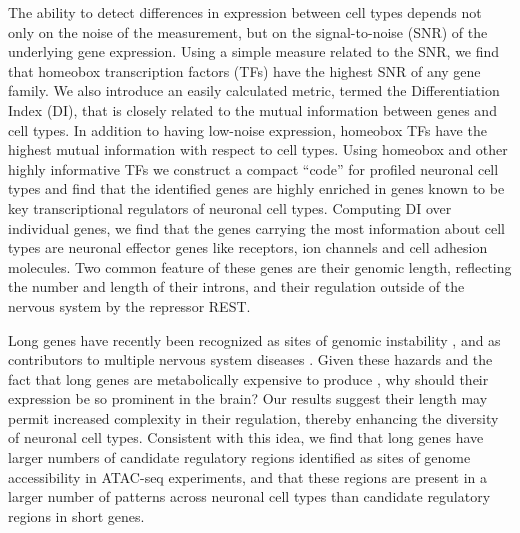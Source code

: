 The ability to detect differences in expression between cell types depends not only on the noise of the measurement, but on the signal-to-noise (SNR) of the underlying gene expression. Using a simple measure related to the SNR, we find that homeobox transcription factors (TFs) have the highest SNR of any gene family. We also introduce an easily calculated metric, termed the Differentiation Index (DI), that is closely related to the mutual information between genes and cell types. In addition to having low-noise expression, homeobox TFs have the highest mutual information with respect to cell types. Using homeobox and other highly informative TFs we construct a compact “code” for profiled neuronal cell types and find that the identified genes are highly enriched in genes known to be key transcriptional regulators of neuronal cell types.
Computing DI over individual genes, we find that the genes carrying the most information about cell types are neuronal effector genes like receptors, ion channels and cell adhesion molecules. Two common feature of these genes are their genomic length, reflecting the number and length of their introns, and their regulation outside of the nervous system by the repressor REST.

Long genes have recently been recognized as sites of genomic instability \cite{Wei_2016}, and as contributors to multiple nervous system diseases \cite{Sugino_2014 ; Gabel_2015 ; Zylka_2015}. Given these hazards and the fact that long genes are metabolically expensive to produce \cite{Castillo_Davis_2002}, why should their expression be so prominent in the brain? Our results suggest their length may permit increased complexity in their regulation, thereby enhancing the diversity of neuronal cell types. Consistent with this idea, we find that long genes have larger numbers of candidate regulatory regions identified as sites of genome accessibility in ATAC-seq experiments, and that these regions are present in a larger number of patterns across neuronal cell types than candidate regulatory regions in short genes.
